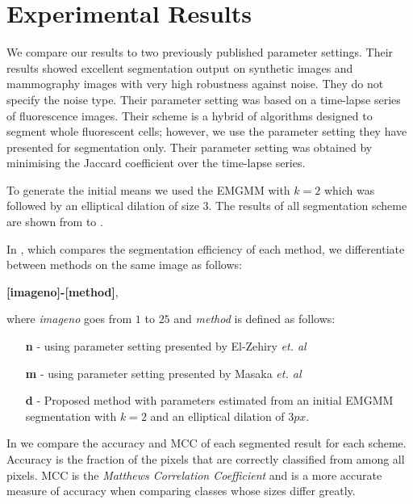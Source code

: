\documentclass[10pt, journal, letterpaper, onecolumn, draftcls]{IEEEtran}
\begin{document}
\section{Experimental Results}
\label{sec:Expresults}
We compare our results to two previously published parameter settings.
Their results showed excellent segmentation output on synthetic images and mammography images with very high robustness against noise. They do not specify the noise type.
Their parameter setting was based on a time-lapse series of fluorescence images. Their scheme is a hybrid of algorithms designed to segment whole fluorescent cells; however, we use the parameter setting they have presented for segmentation only. Their parameter setting was obtained by minimising the Jaccard coefficient over the time-lapse series.

To generate the initial means we used the EMGMM with $k=2$ which was followed by an elliptical dilation of size $3$.
The results of all segmentation scheme are shown from  to .

In , which compares the segmentation efficiency of each method, we differentiate between methods on the same image as follows:

\textbf{[imageno]-[method]}, 

where \textit{imageno} goes from $1$ to $25$ and \textit{method} is defined as follows:
\begin{enumerate}
	\item [\textbf{n}] - using parameter setting presented by El-Zehiry \textit{et. al} %
	\item [\textbf{m}] - using parameter setting presented by Masaka \textit{et. al} %
	\item [\textbf{d}] - Proposed method with parameters estimated from an initial EMGMM segmentation with $k=2$ and an elliptical dilation of $3px$.
\end{enumerate}

In  we compare the accuracy and MCC of each segmented result for each scheme. Accuracy is the fraction of the pixels that are correctly classified from among all pixels. MCC is the \textit{Matthews Correlation Coefficient} and is a more accurate measure of accuracy when comparing classes whose sizes differ greatly. 
\end{document}
